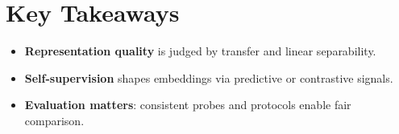 
\section*{Key Takeaways}

\begin{keytakeaways}
\begin{itemize}[leftmargin=2em]
    \item \textbf{Representation quality} is judged by transfer and linear separability.
    \item \textbf{Self-supervision} shapes embeddings via predictive or contrastive signals.
    \item \textbf{Evaluation matters}: consistent probes and protocols enable fair comparison.
\end{itemize}
\end{keytakeaways}


